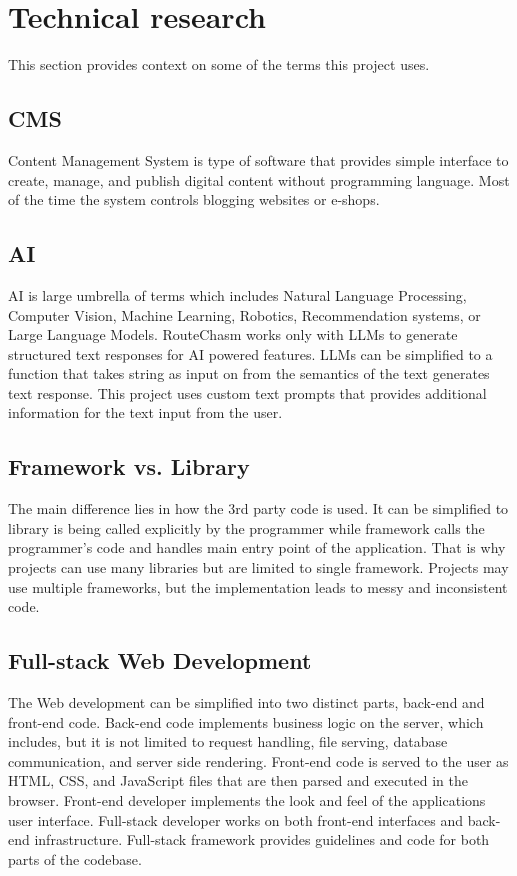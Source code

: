 \section{Technical research}\label{sec:techical-research}
This section provides context on some of the terms this project uses.

\subsection{CMS}\label{subsec:cms}
Content Management System is type of software that provides simple interface to create, manage, and publish digital
content without programming language.
Most of the time the system controls blogging websites or e-shops.

\subsection{AI}\label{subsec:ai}
AI is large umbrella of terms which includes Natural Language Processing, Computer Vision, Machine Learning, Robotics,
Recommendation systems, or Large Language Models.
RouteChasm works only with LLMs to generate structured text responses for AI powered features.
LLMs can be simplified to a function that takes string as input on from the semantics of the text generates text response.
This project uses custom text prompts that provides additional information for the text input from the user.

\subsection{Framework vs. Library}\label{subsec:framework-vs-library}
The main difference lies in how the 3rd party code is used.
It can be simplified to library is being called explicitly by the programmer while framework calls the programmer's code
and handles main entry point of the application.
That is why projects can use many libraries but are limited to single framework.
Projects may use multiple frameworks, but the implementation leads to messy and inconsistent code.

\subsection{Full-stack Web Development}\label{subsec:fullstack-web-development}
The Web development can be simplified into two distinct parts, back-end and front-end code.
Back-end code implements business logic on the server, which includes, but it is not limited to request handling,
file serving, database communication, and server side rendering.
Front-end code is served to the user as HTML, CSS, and JavaScript files that are then parsed and executed in the browser.
Front-end developer implements the look and feel of the applications user interface.
Full-stack developer works on both front-end interfaces and back-end infrastructure.
Full-stack framework provides guidelines and code for both parts of the codebase.
